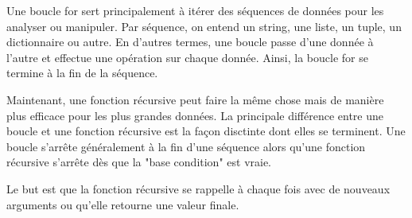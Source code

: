 Une boucle for sert principalement à itérer des séquences de données pour les analyser ou manipuler. Par séquence, on entend un string, une liste, un tuple, un dictionnaire ou autre. En d'autres termes, une boucle passe d'une donnée à l'autre et effectue une opération sur chaque donnée. Ainsi, la boucle for se termine à la fin de la séquence. 

Maintenant, une fonction récursive peut faire la même chose mais de manière plus efficace pour les plus grandes données. La principale différence entre une boucle et une fonction récursive est la façon disctinte dont elles se terminent. Une boucle s'arrête généralement à la fin d'une séquence alors qu'une fonction récursive s'arrête dès que la "base condition" est vraie. 

Le but est que la fonction récursive se rappelle à chaque fois avec de nouveaux arguments ou qu'elle retourne une valeur finale. \\

